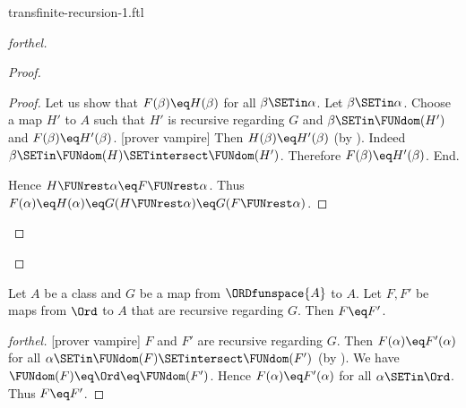 \documentclass{naproche-library}
\begin{document}
\begin{smodule}[title=Transfinite Recursion I]{transfinite-recursion-1.ftl}
\begin{proof}[forthel]
\begin{proof}
\begin{proof}
      Let us show that $F(\beta) \eq H(\beta)$ for all $\beta \SETin \alpha$.
        Let $\beta \SETin \alpha$.
        Choose a map $H'$ to $A$ such that $H'$ is recursive regarding $G$ and $\beta \SETin \FUNdom(H')$ and $F(\beta) \eq H'(\beta)$.
        [prover vampire]
        Then $H(\beta) \eq H'(\beta)$ (by ).
        Indeed $\beta \SETin \FUNdom(H) \SETintersect \FUNdom(H')$.
        Therefore $F(\beta) \eq H'(\beta)$.
      End.

      Hence $H \FUNrest \alpha \eq F \FUNrest \alpha$.
      Thus $F(\alpha)
        \eq H(\alpha)
        \eq G(H \FUNrest \alpha)
        \eq G(F \FUNrest \alpha)$.
    \end{proof}
  \end{proof}
\end{proof}

\begin{theorem}[forthel,title=Transfinite Recursion Theorem: Uniqueness,id=transfinite-recursion_uniqueness]
  Let $A$ be a class and $G$ be a map from $\ORDfunspace{A}$ to $A$.
  Let $F, F'$ be maps from $\Ord$ to $A$ that are recursive regarding $G$.
  Then $F \eq F'$.
\end{theorem}
\begin{proof}[forthel]
  [prover vampire]
  $F$ and $F'$ are recursive regarding $G$.
  Then $F(\alpha) \eq F'(\alpha)$ for all $\alpha \SETin \FUNdom(F) \SETintersect \FUNdom(F')$ (by ).
  We have $\FUNdom(F) \eq \Ord \eq \FUNdom(F')$.
  Hence $F(\alpha) \eq F'(\alpha)$ for all $\alpha \SETin \Ord$.
  Thus $F \eq F'$.
\end{proof}
\end{smodule}
\end{document}
